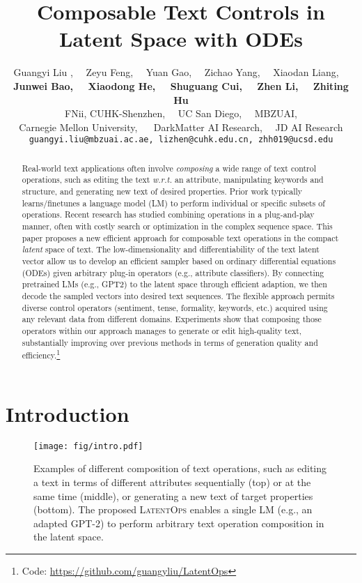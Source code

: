 \documentclass[11pt]{article}
\title{Composable Text Controls in Latent Space with ODEs}
\author{Guangyi Liu ,~~
Zeyu Feng,~~
Yuan Gao,~~
Zichao Yang,~~
Xiaodan Liang,~~\\
{\bf Junwei Bao,~~
Xiaodong He,~~
Shuguang Cui,~~
 Zhen Li,~~
Zhiting Hu}\\
FNii, CUHK-Shenzhen,~~ UC San Diego, ~~MBZUAI, \\Carnegie Mellon University, ~~ DarkMatter AI Research,~~ JD AI Research\\
{\small \tt guangyi.liu@mbzuai.ac.ae, lizhen@cuhk.edu.cn, zhh019@ucsd.edu}
}
\begin{document}
\maketitle


\begin{abstract}
Real-world text applications often involve \emph{composing} a  wide range of text control operations, such as editing the text \emph{w.r.t.} an attribute, manipulating keywords and structure, and generating new text of desired properties. Prior work typically learns/finetunes a language model (LM) to perform individual or specific subsets of operations. Recent research has studied combining operations in a plug-and-play manner, often with costly search or optimization in the complex sequence space. This paper proposes a new efficient approach for composable text operations in the compact \emph{latent} space of text. The low-dimensionality and differentiability of the text latent vector allow us to develop an efficient sampler based on ordinary differential equations (ODEs) given arbitrary plug-in operators (e.g., attribute classifiers). By connecting pretrained LMs (e.g., GPT2) to the latent space through efficient adaption, we then decode the sampled vectors into desired text sequences. The flexible approach permits diverse control operators (sentiment, tense, formality, keywords, etc.) acquired using any relevant data from different domains. Experiments show that composing those operators within our approach manages to generate or edit high-quality text, substantially improving over previous methods in terms of generation quality and efficiency.\footnote{Code: \url{https://github.com/guangyliu/LatentOps}}
\end{abstract}


%
 

\section{Introduction}
\begin{figure}[t]
    \centering
    \texttt{[image: fig/intro.pdf]}
    \vspace{-8pt}
    \caption{Examples of different composition of text operations, such as editing a text in terms of different attributes sequentially (top) or at the same time (middle), or generating a new text of target properties (bottom). The proposed \textsc{LatentOps} enables a single LM (e.g., an adapted GPT-2) to perform arbitrary text operation composition in the latent space.}
    \label{fig:intro}
    \vspace{-15pt}
\end{figure}
\end{document}
